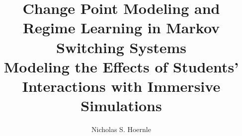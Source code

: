 \documentclass[11pt]{gsasthesis} %
\title{Change Point Modeling and Regime Learning in Markov Switching Systems \\
\large Modeling the Effects of Students' Interactions with Immersive Simulations} %
\author{Nicholas S. Hoernle} %
\begin{document}


\thesistitlepage
\begin{abstract}
%
%
%
\end{abstract}

\renewcommand{\contentsname}{\protect\centering\protect\Large Contents}
\renewcommand{\listtablename}{\protect\centering\protect\Large List of Tables}
\renewcommand{\listfigurename}{\protect\centering\protect\Large List of Figures}
\end{document}
